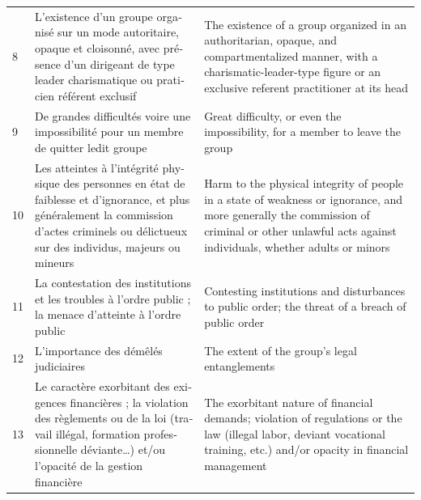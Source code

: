 {\begin{longtable}{@{}p{}p{}p{}@{}}
		8            & \foreignlanguage{french}{L'existence d'un groupe organisé sur un mode autoritaire, opaque et cloisonné, avec présence d'un dirigeant de type leader charismatique ou praticien référent exclusif}                                             & The existence of a group organized in an authoritarian, opaque, and compartmentalized manner, with a charismatic-leader-type figure or an exclusive referent practitioner at its head                 \\
		9            & \foreignlanguage{french}{De grandes difficultés voire une impossibilité pour un membre de quitter ledit groupe}                                                                                                                               & Great difficulty, or even the impossibility, for a member to leave the group                                                                                                                          \\
		10           & \foreignlanguage{french}{Les atteintes à l'intégrité physique des personnes en état de faiblesse et d'ignorance, et plus généralement la commission d'actes criminels ou délictueux sur des individus, majeurs ou mineurs}                    & Harm to the physical integrity of people in a state of weakness or ignorance, and more generally the commission of criminal or other unlawful acts against individuals, whether adults or minors      \\
		11           & \foreignlanguage{french}{La contestation des institutions et les troubles à l'ordre public ; la menace d'atteinte à l'ordre public}                                                                                                           & Contesting institutions and disturbances to public order; the threat of a breach of public order                                                                                                      \\
		12           & \foreignlanguage{french}{L'importance des démêlés judiciaires}                                                                                                                                                                                & The extent of the group's legal entanglements                                                                                                                                                         \\
		13           & \foreignlanguage{french}{Le caractère exorbitant des exigences financières ; la violation des règlements ou de la loi (travail illégal, formation professionnelle déviante\ldots) et/ou l'opacité de la gestion financière}                   & The exorbitant nature of financial demands; violation of regulations or the law (illegal labor, deviant vocational training, etc.) and/or opacity in financial management                             \\

\end{longtable}}
